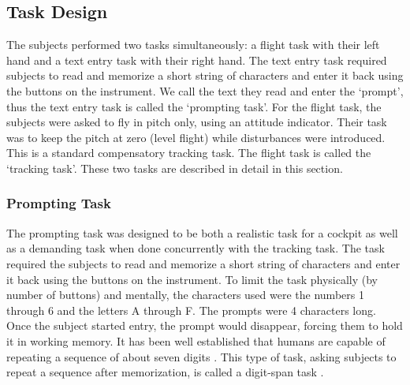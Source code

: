 \subsection{Task Design}



%

The subjects performed two tasks simultaneously: a flight task with their left hand and a text entry task with their right hand.
The text entry task required subjects to read and memorize a short string of characters and enter it back using the buttons on the instrument.
We call the text they read and enter the `prompt', thus the text entry task is called the `prompting task'.
For the flight task, the subjects were asked to fly in pitch only, using an attitude indicator.
Their task was to keep the pitch at zero (level flight) while disturbances were introduced.
This is a standard compensatory tracking task.
The flight task is called the `tracking task'.
These two tasks are described in detail in this section.

\subsubsection{Prompting Task}

The prompting task was designed to be both a realistic task for a cockpit as well as a demanding task when done concurrently with the tracking task.
The task required the subjects to read and memorize a short string of characters and enter it back using the buttons on the instrument.
To limit the task physically (by number of buttons) and mentally, the characters used were the numbers 1 through 6 and the letters A through F.
The prompts were 4 characters long.
Once the subject started entry, the prompt would disappear, forcing them to hold it in working memory.
It has been well established that humans are capable of repeating a sequence of about seven digits \citep{miller_magical_1956}.
This type of task, asking subjects to repeat a sequence after memorization, is called a digit-span task \citep{baddeley_working_1992}.

